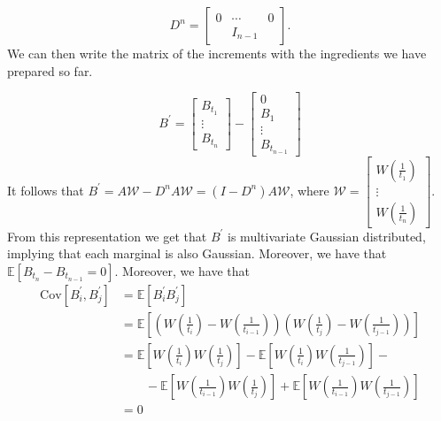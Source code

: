\documentclass[a4paper,12pt]{article} %
\newcommand{\Cov}{\mathrm{Cov}}
\begin{document}
\begin{equation}
    D^n =
    \begin{bmatrix}
        0 & \cdots  & 0 \\
          & I_{n-1} &
    \end{bmatrix}.
\end{equation}
We can then write the matrix of the increments with the ingredients we have prepared so far.

\begin{equation}B^{\prime} =
    \begin{bmatrix}
        B_{t_1} \\
        \vdots  \\
        B_{t_n}
    \end{bmatrix}
    -
    \begin{bmatrix}
        0      \\
        B_1    \\
        \vdots \\
        B_{t_{n-1}}
    \end{bmatrix}
\end{equation}
It follows that \(B^{\prime} = A \mathcal{W}- D^{n}A \mathcal{W}  =(I-D^n)A \mathcal{W} \), where \(\mathcal{W} = \begin{bmatrix}
    W\left( \frac{1}{t_1} \right) \\
    \vdots                        \\
    W\left( \frac{1}{t_n} \right)
\end{bmatrix}\).
From this representation we get that \(B^{\prime} \) is multivariate Gaussian distributed, implying that each marginal is also Gaussian.
Moreover, we have that \(\mathbb{E} \left[ B_{t_n}- B_{t_{n-1}} = 0  \right]\). Moreover, we have that
\begin{align*}
    \Cov\left[B^{\prime}_i, B^{\prime} _j \right]
     & = \mathbb{E} \left[ B_{i}^{\prime}B^{\prime} _j   \right]                                                                                                                                             \\
     & = \mathbb{E} \left[ \left( W\left( \frac{1}{t_i} \right) - W\left( \frac{1}{t_{i-1}} \right) \right) \left( W\left( \frac{1}{t_j} \right) - W\left( \frac{1}{t_{j-1}} \right) \right) \right]         \\
     & = \mathbb{E} \left[ W\left( \frac{1}{t_i} \right) W\left( \frac{1}{t_j} \right) \right] - \mathbb{E} \left[ W\left( \frac{1}{t_i} \right) W\left( \frac{1}{t_{j-1}} \right) \right] -                 \\
     & \quad\quad -\mathbb{E} \left[ W\left( \frac{1}{t_{i-1}} \right) W\left( \frac{1}{t_j} \right) \right] + \mathbb{E} \left[ W\left( \frac{1}{t_{i-1}} \right) W\left( \frac{1}{t_{j-1}} \right) \right] \\
     & = 0
\end{align*}
\end{document}
